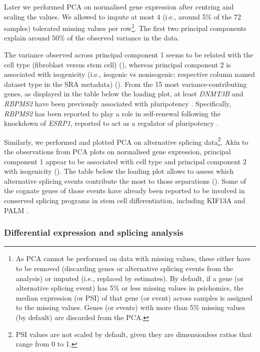 Later we performed PCA on normalised gene expression after centring and scaling the values. We allowed to impute at most 4 (i.e., around 5\% of the 72 samples) tolerated missing values per row\footnote{As PCA cannot be performed on data with missing values, these either have to be removed (discarding genes or alternative splicing events from the analysis) or imputed (i.e., replaced by estimates). By default, if a gene (or alternative splicing event) has 5\% or less missing values in psichomics, the median expression (or PSI) of that gene (or event) across samples is assigned to the missing values. Genes (or events) with more than 5\% missing values (by default) are discarded from the PCA.}. The first two principal components explain around 50\% of the observed variance in the data.

The variance observed across principal component 1 seems to be related with the cell type (fibroblast versus stem cell) (), whereas principal component 2 is associated with isogenicity (i.e., isogenic vs nonisogenic; respective column named dataset type in the SRA metadata) (). From the 15 most variance-contributing genes, as displayed in the table below the loading plot, at least \emph{DNMT3B} and \emph{RBPMS2} have been previously associated with pluripotency \cite{fagoonee:2013vx}. Specifically, \emph{RBPMS2} has been reported to play a role in self-renewal following the knockdown of \emph{ESRP1}, reported to act as a regulator of pluripotency \cite{fagoonee:2013vx}.

Similarly, we performed and plotted PCA on alternative splicing data\footnote{PSI values are not scaled by default, given they are dimensionless ratios that range from 0 to 1.}. Akin to the observations from PCA plots on normalised gene expression, principal component 1 appear to be associated with cell type and principal component 2 with isogenicity (). The table below the loading plot allows to assess which alternative splicing events contribute the most to those separations (). Some of the cognate genes of those events have already been reported to be involved in conserved splicing programs in stem cell differentiation, including KIF13A and PALM \cite{venables:2013tz}.

\subsubsection{Differential expression and splicing analysis}

